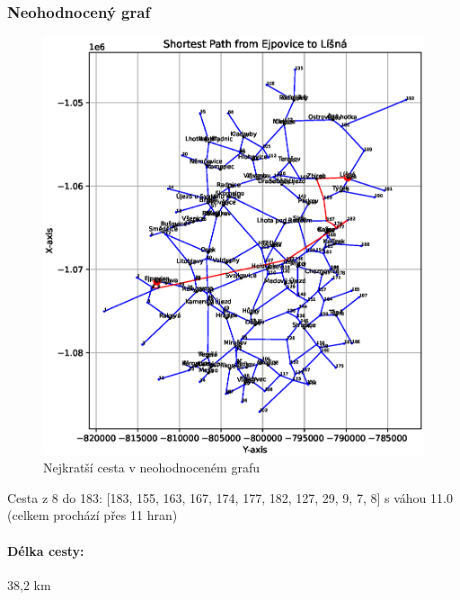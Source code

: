 \subsubsection*{Neohodnocený graf}
\begin{figure}[H]
    \centering
    \includegraphics[width=\textwidth]{images/Ejpovice_unweighted.eps}
    \caption{Nejkratší cesta v neohodnoceném grafu}
\end{figure}
Cesta z 8 do 183: [183, 155, 163, 167, 174, 177, 182, 127, 29, 9, 7, 8] s váhou 11.0 \\
(celkem prochází přes 11 hran)
\paragraph{Délka cesty:} 38,2 km
